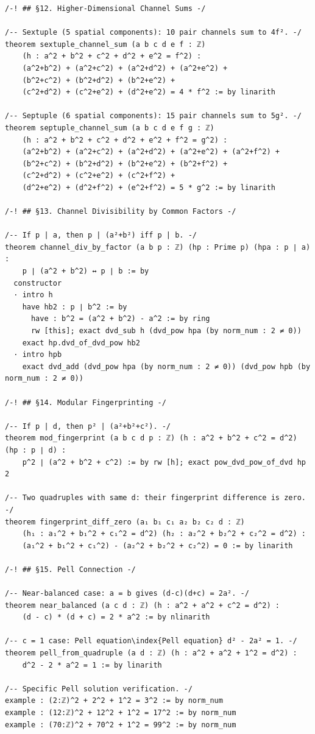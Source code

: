 \documentclass[11pt,openany]{book}
\theoremstyle{definition}
\theoremstyle{plain}
\theoremstyle{remark}
\begin{document}
\begin{lstlisting}[style=lean]
/-! ## §12. Higher-Dimensional Channel Sums -/

/-- Sextuple (5 spatial components): 10 pair channels sum to 4f². -/
theorem sextuple_channel_sum (a b c d e f : ℤ)
    (h : a^2 + b^2 + c^2 + d^2 + e^2 = f^2) :
    (a^2+b^2) + (a^2+c^2) + (a^2+d^2) + (a^2+e^2) +
    (b^2+c^2) + (b^2+d^2) + (b^2+e^2) +
    (c^2+d^2) + (c^2+e^2) + (d^2+e^2) = 4 * f^2 := by linarith

/-- Septuple (6 spatial components): 15 pair channels sum to 5g². -/
theorem septuple_channel_sum (a b c d e f g : ℤ)
    (h : a^2 + b^2 + c^2 + d^2 + e^2 + f^2 = g^2) :
    (a^2+b^2) + (a^2+c^2) + (a^2+d^2) + (a^2+e^2) + (a^2+f^2) +
    (b^2+c^2) + (b^2+d^2) + (b^2+e^2) + (b^2+f^2) +
    (c^2+d^2) + (c^2+e^2) + (c^2+f^2) +
    (d^2+e^2) + (d^2+f^2) + (e^2+f^2) = 5 * g^2 := by linarith

/-! ## §13. Channel Divisibility by Common Factors -/

/-- If p | a, then p | (a²+b²) iff p | b. -/
theorem channel_div_by_factor (a b p : ℤ) (hp : Prime p) (hpa : p ∣ a) :
    p ∣ (a^2 + b^2) ↔ p ∣ b := by
  constructor
  · intro h
    have hb2 : p ∣ b^2 := by
      have : b^2 = (a^2 + b^2) - a^2 := by ring
      rw [this]; exact dvd_sub h (dvd_pow hpa (by norm_num : 2 ≠ 0))
    exact hp.dvd_of_dvd_pow hb2
  · intro hpb
    exact dvd_add (dvd_pow hpa (by norm_num : 2 ≠ 0)) (dvd_pow hpb (by norm_num : 2 ≠ 0))

/-! ## §14. Modular Fingerprinting -/

/-- If p | d, then p² | (a²+b²+c²). -/
theorem mod_fingerprint (a b c d p : ℤ) (h : a^2 + b^2 + c^2 = d^2) (hp : p ∣ d) :
    p^2 ∣ (a^2 + b^2 + c^2) := by rw [h]; exact pow_dvd_pow_of_dvd hp 2

/-- Two quadruples with same d: their fingerprint difference is zero. -/
theorem fingerprint_diff_zero (a₁ b₁ c₁ a₂ b₂ c₂ d : ℤ)
    (h₁ : a₁^2 + b₁^2 + c₁^2 = d^2) (h₂ : a₂^2 + b₂^2 + c₂^2 = d^2) :
    (a₁^2 + b₁^2 + c₁^2) - (a₂^2 + b₂^2 + c₂^2) = 0 := by linarith

/-! ## §15. Pell Connection -/

/-- Near-balanced case: a = b gives (d-c)(d+c) = 2a². -/
theorem near_balanced (a c d : ℤ) (h : a^2 + a^2 + c^2 = d^2) :
    (d - c) * (d + c) = 2 * a^2 := by nlinarith

/-- c = 1 case: Pell equation\index{Pell equation} d² - 2a² = 1. -/
theorem pell_from_quadruple (a d : ℤ) (h : a^2 + a^2 + 1^2 = d^2) :
    d^2 - 2 * a^2 = 1 := by linarith

/-- Specific Pell solution verification. -/
example : (2:ℤ)^2 + 2^2 + 1^2 = 3^2 := by norm_num
example : (12:ℤ)^2 + 12^2 + 1^2 = 17^2 := by norm_num
example : (70:ℤ)^2 + 70^2 + 1^2 = 99^2 := by norm_num


\end{lstlisting}
\end{document}
